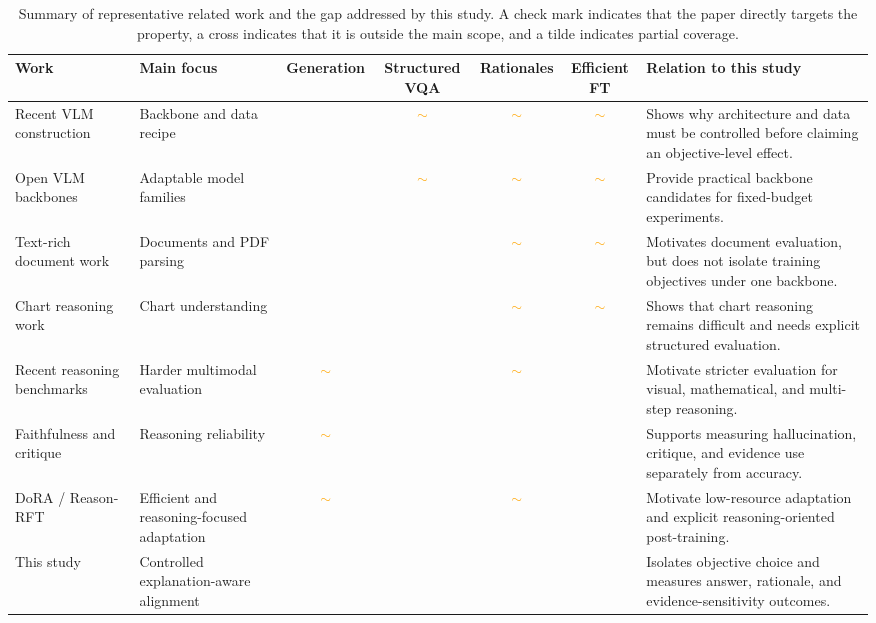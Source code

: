 \documentclass[preprint,12pt]{elsarticle}
\newcommand{\cmark}{\ding{51}}
\newcommand{\xmark}{\ding{55}}
\newcommand{\pmark}{\textcolor{orange}{$\sim$}}
\begin{document}
\begin{table}[!ht]
\centering
\caption{Summary of representative related work and the gap addressed by this study. A check mark indicates that the paper directly targets the property, a cross indicates that it is outside the main scope, and a tilde indicates partial coverage.}
\label{tab:LiteratureSummary}
\scriptsize
\begin{adjustbox}{max width=\textwidth}
\begin{tabular}{|p{3.2cm}|p{2.4cm}|c|c|c|c|p{4.5cm}|}
\hline
\textbf{Work} & \textbf{Main focus} & \textbf{Generation} & \textbf{Structured VQA} & \textbf{Rationales} & \textbf{Efficient FT} & \textbf{Relation to this study} \\ \hline
Recent VLM construction~\cite{laurencon2024whatmatters,deitke2025molmo,li2025llavaonevision,zhang2025mm15} & Backbone and data recipe & \cmark & \pmark & \pmark & \pmark & Shows why architecture and data must be controlled before claiming an objective-level effect. \\ \hline
Open VLM backbones~\cite{wang2024qwen2vl,li2023blip2} & Adaptable model families & \cmark & \pmark & \pmark & \pmark & Provide practical backbone candidates for fixed-budget experiments. \\ \hline
Text-rich document work~\cite{fu2025textrichsurvey,wang2024docllm,ouyang2025omnidocbench} & Documents and PDF parsing & \cmark & \cmark & \pmark & \pmark & Motivates document evaluation, but does not isolate training objectives under one backbone. \\ \hline
Chart reasoning work~\cite{masry2024chartinstruct,masry2025chartgemma,tang2025chartmuseum,yang2025chartmimic} & Chart understanding & \cmark & \cmark & \pmark & \pmark & Shows that chart reasoning remains difficult and needs explicit structured evaluation. \\ \hline
Recent reasoning benchmarks~\cite{lu2024mathvista,yue2024mmmu,chen2024mmstar,yue2025mmmupro,yao2025mmreason} & Harder multimodal evaluation & \pmark & \cmark & \pmark & \xmark & Motivate stricter evaluation for visual, mathematical, and multi-step reasoning. \\ \hline
Faithfulness and critique~\cite{guan2024hallusionbench,jiang2024hacl,wu2025visco,zhang2025criticv} & Reasoning reliability & \pmark & \cmark & \cmark & \xmark & Supports measuring hallucination, critique, and evidence use separately from accuracy. \\ \hline
DoRA / Reason-RFT~\cite{liu2024dora,tan2025reasonrft} & Efficient and reasoning-focused adaptation & \pmark & \xmark & \pmark & \cmark & Motivate low-resource adaptation and explicit reasoning-oriented post-training. \\ \hline
This study & Controlled explanation-aware alignment & \cmark & \cmark & \cmark & \cmark & Isolates objective choice and measures answer, rationale, and evidence-sensitivity outcomes. \\ \hline
\end{tabular}
\end{adjustbox}
\end{table}
\end{document}
